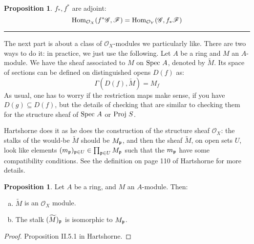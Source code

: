 \documentclass[10pt,reqno]{amsart}
\theoremstyle{definition}
\newtheorem{proposition}[theorem]{Proposition}
\theoremstyle{remark}
\numberwithin{equation}{section}
\numberwithin{theorem}{section}
\newcommand{\OO}{{\mathcal O}}
\newcommand{\spec}{\textup{Spec }}
\newcommand{\Hom}{\textup{Hom}}
\newcommand{\FF}{{\mathscr F}}
\newcommand{\GG}{{\mathscr G}}
\newcommand{\pp}{\frak{p}}
\newcommand{\wt}{\widetilde}
\begin{document}
\begin{proposition} $f_*, f^*$ are adjoint:
\[\Hom_{\OO_X}(f^* \GG, \FF) = \Hom_{\OO_Y}(\GG,f_* \FF)\]
\end{proposition}

\hrule
\vspace{1em}

The next part is about a class of $\OO_X$-modules we particularly like. There are two ways to do it: in practice, we just use the following. Let $A$ be a ring and $M$ an $A$-module. We have the sheaf associated to $M$ on $\spec A$, denoted by $\wt{M}$. Its space of sections can be defined on distinguished opens $D(f)$ as:
\[\Gamma(D(f),\wt{M}) = M_f \]
As usual, one has to worry if the restriction maps make sense, if you have $D(g) \subseteq D(f)$, but the details of checking that are similar to checking them for the structure sheaf of $\spec A$ or $\textup{Proj } S$.

Hartshorne does it as he does the construction of the structure sheaf $\OO_X$: the stalks of the would-be $\wt{M}$ should be $M_{\pp}$, and then the sheaf $\wt{M}$, on open sets $U$, look like elements $(m_{\pp})_{\pp \in U} \in \prod_{\pp \in U} M_{\pp}$ such that the $m_{\pp}$ have some compatibility conditions. See the definition on page 110 of Hartshorne for more details.

\begin{proposition}
Let $A$ be a ring, and $M$ an $A$-module. Then:
\begin{enumerate}[(a)]
\item $\wt{M}$ is an $\OO_X$ module.
\item The stalk $(\wt{M})_{\pp}$ is isomorphic to $M_{\pp}$.
\end{enumerate}
\end{proposition}
\begin{proof}
Proposition II.5.1 in Hartshorne.
\end{proof}
\end{document}
